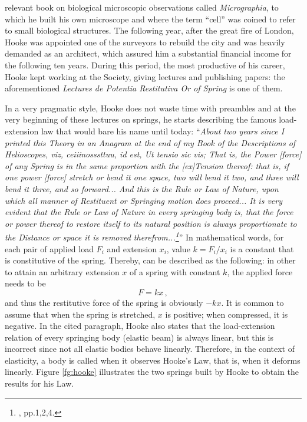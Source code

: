 relevant book on biological microscopic observations called \emph{Micrographia}, to which he built his own microscope and where the term ``cell'' was coined to refer to small biological structures. The following year, after the great fire of London, Hooke was appointed one of the surveyors to rebuild the city and was heavily demanded as an architect, which assured him a substantial financial income for the following ten years. During this period, the most productive of his career, Hooke kept working at the Society, giving lectures and publishing papers: the aforementioned \emph{Lectures \emph{de Potentia Restitutiva} Or of Spring} is one of them. 



In a very pragmatic style, Hooke does not waste time with preambles and at the very beginning of these lectures on springs, he starts describing the famous load-extension law that would bare his name until today: ``\emph{About two years since I printed this Theory in an Anagram at the end of my Book of the Descriptions of Helioscopes, \emph{viz, ceiiinosssttuu, id est, Ut tensio sic vis}; That is, the Power [force] of any Spring is in the same proportion with the [ex]Tension thereof: that is, if one power [force] stretch or bend it one space, two will bend it two, and three will bend it three, and so forward... And this is the Rule or Law of Nature, upon which all manner of Restituent or Springing motion does proceed... It is very evident that the Rule or Law of Nature in every springing body is, that the force or power thereof to restore itself to its natural position is always proportionate to the Distance or space it is removed therefrom...\footnote{\cite{hooke_1678_1}, pp.1,2,4.}}'' In mathematical words, for each pair of applied load $F_i$ and extension $x_i$, value $k=F_i/x_i$ is a constant that is constitutive of the spring. Thereby,  can be described as the following: in other to attain an arbitrary extension $x$ of a spring with constant $k$, the applied force needs to be 
\begin{equation}
F=kx\,,
\end{equation}
and thus the restitutive force of the spring is obviously $-kx$. It is common to assume that when the spring is stretched, $x$ is positive; when compressed, it is negative. In the cited paragraph, Hooke also states that the load-extension relation of every springing body (elastic beam) is always linear, but this is incorrect since not all elastic bodies behave linearly. Therefore, in the context of elasticity, a body is called  when it observes Hooke's Law, that is, when it deforms linearly. Figure \ref{fg:hooke} illustrates the two springs built by Hooke to obtain the results for his Law.  
